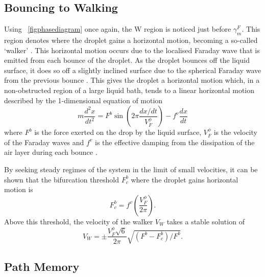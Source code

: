 \documentclass[11pt]{article}
\newcommand{\figref}[2][\figurename~]{#1\ref{#2}}
\begin{document}
\subsection{Bouncing to Walking}
\label{secbouncingtowalking}

Using \figref{figphasediagram} once again, the W region is noticed just before $\gamma_m^F$.  This region denotes where the droplet gains a horizontal motion, becoming a so-called `walker' \cite{5}.  This horizontal motion occurs due to the localised Faraday wave that is emitted from each bounce of the droplet.  As the droplet bounces off the liquid surface, it does so off a slightly inclined surface due to the spherical Faraday wave from the previous bounce \cite{9}.  This gives the droplet a horizontal motion which, in a non-obstructed region of a large liquid bath, tends to a linear horizontal motion described by the 1-dimensional equation of motion
\begin{equation}
    \label{eqofmotion}
    m\frac{d^2x}{dt^2}=F^b\sin\left(2\pi\frac{dx/dt}{V_F^\phi}\right)-f^v\frac{dx}{dt}
\end{equation}
where $F^b$ is the force exerted on the drop by the liquid surface, $V_F^\phi$ is the velocity of the Faraday waves and $f^v$ is the effective damping from the dissipation of the air layer during each bounce \cite{9}.

By seeking steady regimes of the system in the limit of small velocities, it can be shown that the bifurcation threshold $F^b_c$ where the droplet gains horizontal motion is
\begin{equation}
    \label{walkingthreshold}
    F^b_c=f^v\left(\frac{V_F^\phi}{2\pi}\right).
\end{equation}
Above this threshold, the velocity of the walker $V_W$ takes a stable solution of
\begin{equation}
\label{walkervelocity}
V_W=\pm\frac{V_F^\phi\sqrt{6}}{2\pi}\sqrt{\left(F^b-F_c^b\right)/F^b}.
\end{equation}

\subsection{Path Memory}
\label{secpathmemory}
\end{document}
